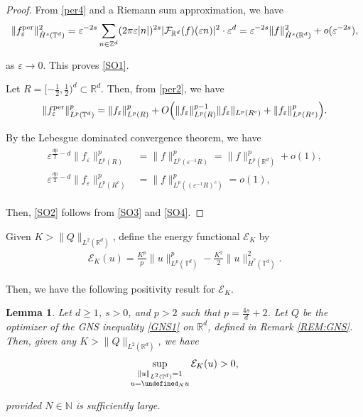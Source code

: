 \documentclass[letterpaper, 11pt,  reqno]{amsart}
\newtheorem{lemma}[theorem]{Lemma}
\newcommand{\noi}{\noindent}
\newcommand{\Z}{\mathbb{Z}}
\newcommand{\R}{\mathbb{R}}
\newcommand{\T}{\mathbb{T}}
\let\P= \undefined
\newcommand{\P}{\mathbf{P}}
\newcommand{\F}{\mathcal{F}}
\newcommand{\eps}{\varepsilon}
\renewcommand{\S}{\mathcal{S}}
\newcommand{\N}{\mathbb{N}}
\newcommand{\EE}{\mathcal{E}}
\numberwithin{equation}{section}
\numberwithin{theorem}{section}
\renewcommand{\u}{\vec{u}}
\newcommand{\per}{\textup{per}}
\begin{document}
\begin{proof}
From \eqref{per4}
and a Riemann sum approximation, we have 
\begin{align*}
\| f_\eps^\per\|_{\dot H^s(\T^d)}^2
= 
\eps^{-2s} 
\sum_{n \in \Z^d} (2\pi \eps |n|)^{2s} 
 |\F_{\R^d} (f) (\eps n)|^2 \cdot \eps^d
 = \eps^{-2s} 
 \| f \|^2_{\dot H^{s} (\R^d)} + o(\eps^{-2s}), 
\end{align*}

\noi
as $\eps \to 0$.
This proves \eqref{SO1}.


Let $R=  [- \frac 12, \frac12)^d\subset \R^d$.
Then, from \eqref{per2}, we have 
\begin{align}
\| f_\eps^\per  \|_{L^p (\mathbb{T}^d)}^p 
=
\| f_\eps  \|_{L^p (R)}^p 
+ O\Big(\| f_\eps  \|_{L^p (R)}^{p-1}
\| f_\eps  \|_{L^p (R^c)} 
+ \| f_\eps  \|_{L^p (R^c)}^p \Big).
\label{SO3}
\end{align}


\noi
By the Lebesgue dominated convergence theorem, 
we have
\begin{align}
\begin{split}
\eps^{\frac{d p}{2} - d} \| f_\eps  \|_{L^p (R)}^p 
& = 
 \| f \|^p_{L^p (\eps^{-1}R)}
=  \| f \|^p_{L^p (\R^d)} + o(1), \\
\eps^{\frac{d p}{2} - d} \| f_\eps  \|_{L^p (R^c)}^p 
& = 
 \| f \|^p_{L^p ((\eps^{-1}R)^c)}
=   o(1), 
\end{split}
\label{SO4}
\end{align}


\noi
Then, \eqref{SO2} follows from \eqref{SO3} and \eqref{SO4}.
\end{proof}




Given  $K> \|Q\|_{L^2 (\R^d)}$, define the energy functional $\EE_K$ by 
\begin{align}
\EE_K(u)
= \frac{K^p}{p}\|u\|^{p}_{L^p(\T^d)}-\frac{K^2}{2}\|u\|^2_{\dot H^{s}(\T^d)}.
\label{QQ1}
\end{align}

\noi
Then, we have the following positivity result for $\EE_K$.


\begin{lemma}
\label{LEM:sol2}
Let $d \ge 1$, $s > 0$, and $p > 2$
such that 
 $p=\frac{4s}{d}+2$.
Let $Q$ be the optimizer of the GNS inequality \eqref{GNS1}
on $\R^d$, 
defined in Remark \ref{REM:GNS}.
Then, given any   $K> \|Q\|_{L^2 (\R^d)}$, 
we have
\begin{align}
\sup_{\substack{\|u\|_{L^{2}(\T^d)}=1\\u=\P_Nu}}
\EE_K(u) > 0, 
\label{QQ2}
\end{align}

\noi
provided $N \in \N$ is sufficiently large.
\end{lemma}
\end{document}
